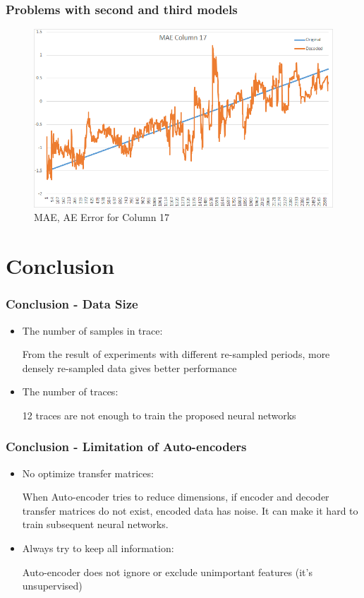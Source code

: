 \documentclass{beamer}
\begin{document}
\begin{frame}
\frametitle{Problems with second and third models}
\begin{figure}[t!]
    \centering
    \includegraphics[width=\textwidth]{../paper/pictures/result_pictures/MAE_Column_17.png}
    \caption{MAE, AE Error for Column 17}
    \label{fig:mae_error_c17}
\end{figure}
\end{frame}

\section{Conclusion}
\begin{frame}
\frametitle{Conclusion - Data Size}
\begin{itemize}
\item The number of samples in trace:

From the result of experiments with different re-sampled periods, more densely re-sampled data gives better performance

\item The number of traces:

12 traces are not enough to train the proposed neural networks

\end{itemize}
\end{frame}

\begin{frame}
\frametitle{Conclusion - Limitation of Auto-encoders}
\begin{itemize}
\item No optimize transfer matrices:

When Auto-encoder tries to reduce dimensions, if encoder and decoder transfer matrices do not exist, encoded data has noise. It can make it hard to train subsequent neural networks.

\item Always try to keep all information:

Auto-encoder does not ignore or exclude unimportant features (it's unsupervised)

\end{itemize}
\end{frame}
\end{document}
